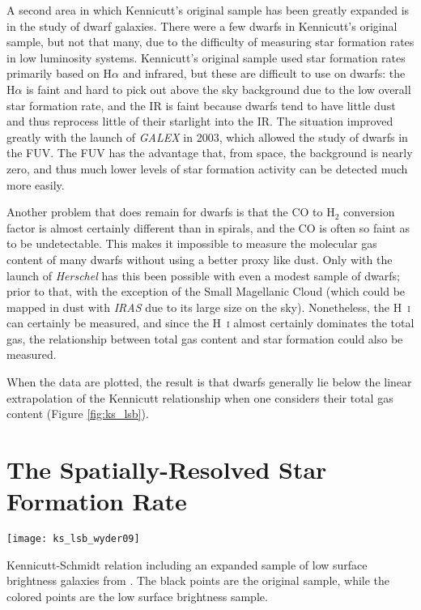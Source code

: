 A second area in which Kennicutt's original sample has been greatly expanded is in the study of dwarf galaxies. There were a few dwarfs in Kennicutt's original sample, but not that many, due to the difficulty of measuring star formation rates in low luminosity systems. Kennicutt's original sample used star formation rates primarily based on H$\alpha$ and infrared, but these are difficult to use on dwarfs: the H$\alpha$ is faint and hard to pick out above the sky background due to the low overall star formation rate, and the IR is faint because dwarfs tend to have little dust and thus reprocess little of their starlight into the IR. The situation improved greatly with the launch of \textit{GALEX} in 2003, which allowed the study of dwarfs in the FUV. The FUV has the advantage that, from space, the background is nearly zero, and thus much lower levels of star formation activity can be detected much more easily.

Another problem that does remain for dwarfs is that the CO to H$_2$ conversion factor is almost certainly different than in spirals, and the CO is often so faint as to be undetectable. This makes it impossible to measure the molecular gas content of many dwarfs without using a better proxy like dust. Only with the launch of \textit{Herschel} has this been possible with even a modest sample of dwarfs; prior to that, with the exception of the Small Magellanic Cloud (which could be mapped in dust with \textit{IRAS} due to its large size on the sky). Nonetheless, the H~\textsc{i} can certainly be measured, and since the H~\textsc{i} almost certainly dominates the total gas, the relationship between total gas content and star formation could also be measured.

When the data are plotted, the result is that dwarfs generally lie below the linear extrapolation of the Kennicutt relationship when one considers their total gas content (Figure \ref{fig:ks_lsb}).

\section{The Spatially-Resolved Star Formation Rate}

\begin{marginfigure}
\texttt{[image: ks\_lsb\_wyder09]}
\caption[Kennicutt-Schmidt relation, with additional low surface brightness sample]{
\label{fig:ks_lsb}
Kennicutt-Schmidt relation including an expanded sample of low surface brightness galaxies from \citet{wyder09a}. The black points are the original \citet{kennicutt98a} sample, while the colored points are the low surface brightness sample.
}
\end{marginfigure}

